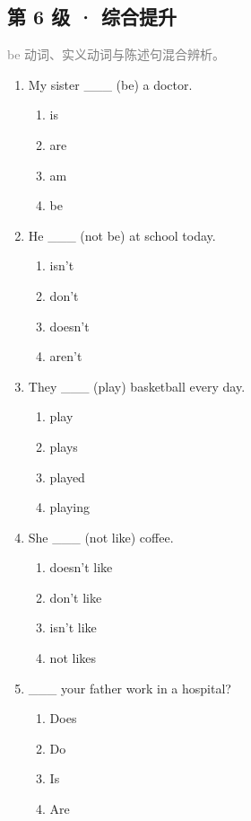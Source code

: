\documentclass[11pt,a4paper]{ctexart}
\begin{document}
\subsection*{第 6 级 · 综合提升}
\noindent\textcolor{gray}{be 动词、实义动词与陈述句混合辨析。}\par\smallskip
\begin{enumerate}[leftmargin=*,itemsep=4pt]
\item My sister \_\_\_ (be) a doctor.
\begin{enumerate}[label=\Alph*.,leftmargin=2em,itemsep=1pt,topsep=2pt]
\item is
\item are
\item am
\item be
\end{enumerate}
\item He \_\_\_ (not be) at school today.
\begin{enumerate}[label=\Alph*.,leftmargin=2em,itemsep=1pt,topsep=2pt]
\item isn’t
\item don’t
\item doesn’t
\item aren’t
\end{enumerate}
\item They \_\_\_ (play) basketball every day.
\begin{enumerate}[label=\Alph*.,leftmargin=2em,itemsep=1pt,topsep=2pt]
\item play
\item plays
\item played
\item playing
\end{enumerate}
\item She \_\_\_ (not like) coffee.
\begin{enumerate}[label=\Alph*.,leftmargin=2em,itemsep=1pt,topsep=2pt]
\item doesn’t like
\item don’t like
\item isn’t like
\item not likes
\end{enumerate}
\item \_\_\_ your father work in a hospital?
\begin{enumerate}[label=\Alph*.,leftmargin=2em,itemsep=1pt,topsep=2pt]
\item Does
\item Do
\item Is
\item Are

\end{enumerate}
\end{enumerate}
\end{document}

